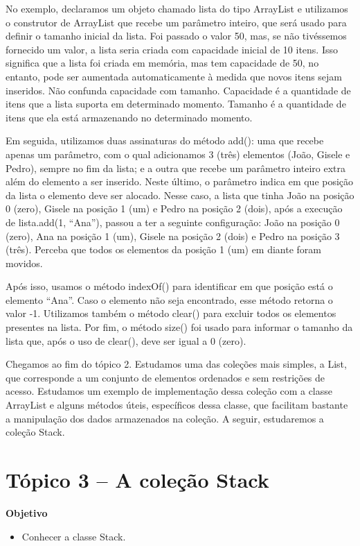 \documentclass[11pt]{article}
\begin{document}
No exemplo, declaramos um objeto chamado lista do tipo ArrayList e utilizamos o construtor de ArrayList que recebe um parâmetro inteiro, que será usado para definir o tamanho inicial da lista. Foi passado o valor 50, mas, se não tivéssemos fornecido um valor, a lista seria criada com capacidade inicial de 10 itens. Isso significa que a lista foi criada em memória, mas tem capacidade de 50, no entanto, pode ser aumentada automaticamente à medida que novos itens sejam inseridos. Não confunda capacidade com tamanho. Capacidade é a quantidade de itens que a lista suporta em determinado momento. Tamanho é a quantidade de itens que ela está armazenando no determinado momento.

Em seguida, utilizamos duas assinaturas do método add(): uma que recebe apenas um parâmetro, com o qual adicionamos 3 (três) elementos (João, Gisele e Pedro), sempre no fim da lista; e a outra que recebe um parâmetro inteiro extra além do elemento a ser inserido. Neste último, o parâmetro indica em que posição da lista o elemento deve ser alocado. Nesse caso, a lista que tinha João na posição 0 (zero), Gisele na posição 1 (um) e Pedro na posição 2 (dois), após a execução de lista.add(1, “Ana”), passou a ter a seguinte configuração: João na posição 0 (zero), Ana na posição 1 (um), Gisele na posição 2 (dois) e Pedro na posição 3 (três). Perceba que todos os elementos da posição 1 (um) em diante foram movidos.

Após isso, usamos o método indexOf() para identificar em que posição está o elemento “Ana”. Caso o elemento não seja encontrado, esse método retorna o valor -1. Utilizamos também o método clear() para excluir todos os elementos presentes na lista. Por fim, o método size() foi usado para informar o tamanho da lista que, após o uso de clear(), deve ser igual a 0 (zero).

Chegamos ao fim do tópico 2. Estudamos uma das coleções mais simples, a List, que corresponde a um conjunto de elementos ordenados e sem restrições de acesso. Estudamos um exemplo de implementação dessa coleção com a classe ArrayList e alguns métodos úteis, específicos dessa classe, que facilitam bastante a manipulação dos dados armazenados na coleção. A seguir, estudaremos a coleção Stack.

\section{Tópico 3 – A coleção Stack}
\label{sec:org0e90a3f}
\textbf{Objetivo}
\begin{itemize}
\item Conhecer a classe Stack.
\end{itemize}
\end{document}
